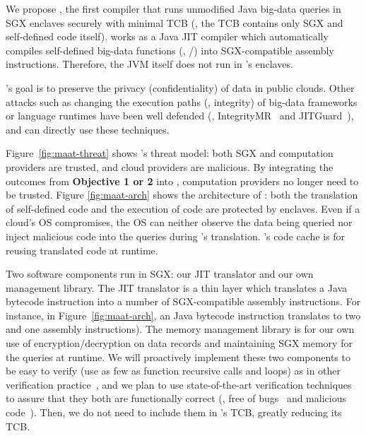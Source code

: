 We propose \maat, the first compiler that runs unmodified Java big-data queries 
in SGX enclaves securely with minimal TCB (\ie, the TCB contains only SGX and 
self-defined code itself). \maat works as a Java JIT compiler which 
automatically compiles self-defined big-data functions (\eg, 
/) into SGX-compatible assembly instructions. 
Therefore, the JVM itself does not run in \maat's enclaves.

\maat's goal is to preserve the privacy (confidentiality) of data in public 
clouds. Other attacks such as changing the execution paths (\ie, integrity) of 
big-data frameworks or language runtimes have been well defended (\eg, 
IntegrityMR~\cite{wang2013integritymr} and JITGuard~\cite{jitguard:ccs17}), and 
\maat can directly use these techniques.

Figure~\ref{fig:maat-threat} shows \maat's threat model: both SGX and 
computation providers are trusted, and cloud providers are malicious. By 
integrating the outcomes from \textbf{Objective 1 or 2} into \maat, computation 
providers no longer need to be trusted. Figure \ref{fig:maat-arch} shows the 
architecture of \maat: both the translation of self-defined code and 
the execution of code are protected by enclaves. Even if a cloud's 
OS compromises, the OS can neither observe the data being queried nor inject 
malicious code into the queries during \maat's translation. \maat's code cache 
is for reusing translated code at runtime.

Two \maat software components run in SGX: our JIT translator 
and our own management library. The JIT translator is a thin layer which 
translates a Java bytecode instruction into a number of SGX-compatible 
assembly instructions. For instance, in Figure~\ref{fig:maat-arch}, an 
 Java bytecode instruction translates to two  and one 
 assembly instructions). The memory management library is for our own 
use of encryption/decryption on data records and maintaining SGX memory for the 
queries at runtime. We will proactively implement these two components to be 
easy to verify (use as few as function recursive calls and loops) as in other 
verification practice~\cite{xi:sosp17}, and we plan to use state-of-the-art 
verification techniques~\cite{xi:sosp17} to assure that they both are 
functionally correct (\ie, free of bugs~\cite{xi:sosp17} and 
malicious code~\cite{adelstein2002malicious}). Then, we do not 
need to include them in \maat's TCB, greatly reducing its TCB.



